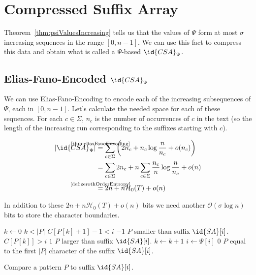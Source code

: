 \section{Compressed Suffix Array}

Theorem~\ref{thm:psiValuesIncreasing} tells us that the values of $\Psi$ form at most $\sigma$ increasing sequences in the range $[0,n-1]$. We can use this fact to compress this data and obtain what is called a $\Psi$-based  $\id{CSA}_\Psi$.

\subsection{Elias-Fano-Encoded $\id{CSA}_\Psi$}

We can use Elias-Fano-Encoding to encode each of the increasing subsequences of $\Psi$, each in $[0, n-1]$. Let's calculate the needed space for each of these sequences. For each $c \in \Sigma$, $n_c$ is the number of occurrences of $c$ in the text (so the length of the increasing run corresponding to the suffixes starting with $c$).

\begin{align}
  \begin{aligned}
    \vert \id{CSA}_\Psi \vert
    &\stackrel{\mathclap{\text{\ref{thm:eliasFanoEncoding}}}}{=}
    \sum_{c \in \Sigma} \left(2n_c + n_c\log\frac{n}{n_c} + o(n_c)\right) \\
    &= \sum_{c \in \Sigma} 2n_c + n\sum_{c \in \Sigma}\frac{n_c}{n}\log\frac{n}{n_c} + o(n) \\
    &\stackrel{\mathclap{\text{\ref{def:zerothOrderEntropy}}}}{=} 2n + n\mathcal{H}_0(T) + o(n)
  \end{aligned}
\end{align}

In addition to these $2n + n\mathcal{H}_0(T) + o(n)$ bits we need another $\mathcal{O}(\sigma\log n)$ bits to store the character boundaries.

\begin{algorithm}[htb]
  \begin{codebox}
    \li $k \gets 0$
    \li \While $k < \vert P \vert$
        \Do
    \li   \If $C[P[k] + 1] - 1 < i$
          \label{line:compareCSACheckSmaller}
          \Then
    \li     \Return $-1$ \>\>\>\>\Comment $P$ smaller than suffix $\id{SA}[i]$.
    \li   \ElseIf $C[P[k]] > i$
          \label{line:compareCSACheckBigger}
          \Then
    \li     \Return $1$ \>\>\>\>\Comment $P$ larger than suffix $\id{SA}[i]$.
          \End
    \li   $k \gets k + 1$
    \li   $i \gets \Psi[i]$
        \End
    \li \Return $0$ \>\>\>\>\>\>\Comment $P$ equal to the first $\vert P \vert$ character of the suffix $\id{SA}[i]$.
  \end{codebox}
  \caption{Compare a pattern $P$ to suffix $\id{SA}[i]$.}
  \label{alg:compareCompressedSuffixArrayPsi}
\end{algorithm}

